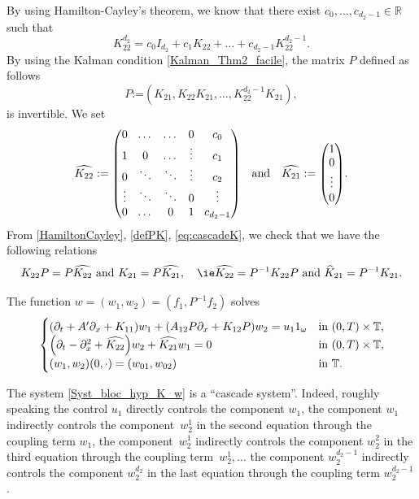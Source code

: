 \documentclass[10pt]{amsart}
\theoremstyle{plain}
\theoremstyle{definition}
\theoremstyle{remark}
\newcommand{\set}{\mathbb}
\newcommand{\R}{} %
\renewcommand{\R}{\set{R}}
\newcommand{\T}{\set{T}}
\newcommand{\coloneqq}{\mathrel{\mathord{:}\mathord=}}
\let\originalleft\left
\let\originalright\right
\renewcommand{\left}{\mathopen{}\mathclose\bgroup\originalleft}
\renewcommand{\right}{\aftergroup\egroup\originalright}
\begin{document}
By using Hamilton-Cayley's theorem, we know that there exist $c_0, \dots, c_{d_2-1} \in \R$ such that
\begin{equation}
\label{HamiltonCayley}
K_{22}^{d_2} = c_0 I_{d_2} + c_1 K_{22} + \dots + c_{d_2-1} K_{22}^{d_2-1}.
\end{equation}
By using the Kalman condition \eqref{Kalman_Thm2_facile}, the matrix $P$ defined as follows
\begin{equation}
\label{defPK}
P \coloneqq (K_{21}, K_{22} K_{21}, \dots, K_{22}^{d_2-1} K_{21}),
\end{equation}
is invertible. We set
\begin{equation}
\label{eq:cascadeK}
\arraycolsep4.5pt
\widehat{K_{22}}\coloneqq \begin{pmatrix} 0 & \dots & \dots & 0 & c_0\\
1 & 0 &\dots & \vdots & c_1\\
0 & \ddots & \ddots & \vdots & c_2\\
\vdots & \ddots & \ddots & 0 & \vdots\\
0 & \dots &0 & 1 & c_{d_2-1}
\end{pmatrix}\quad \text{and}\quad \widehat{K_{21}}\coloneqq \begin{pmatrix} 1\\0\\ \vdots\\ 0 \end{pmatrix}.
\end{equation}
From \eqref{HamiltonCayley}, \eqref{defPK}, \eqref{eq:cascadeK}, we check that we have the following relations
\[
K_{22}P = P \widehat{K_{22}}\ \text{and}\ K_{21} = P \widehat{K_{21}},\quad \text{\ie} \widehat{K_{22}}= P^{-1} K_{22} P\ \text{and}\ {\widehat K}_{21}= P^{-1} K_{21}.
\]

The function $w =(w_1,w_2) = (f_1,P^{-1}f_2)$ solves
\begin{equation} \label{Syst_bloc_hyp_K_w}
\begin{cases}
\left(\partial_t +A'\partial_x+K_{11}\right)w_1+\left(A_{12}P\partial_x+K_{12}P\right)w_2= u_1 1_\omega
&\text{in}\ (0,T)\times \T,\!\\
\left(\partial_t - \partial_x^2+\widehat{K_{22}}\right)w_2 + \widehat{K_{21}}w_1 = 0 &\text{in}\ (0,T)\times \T,\!\\
(w_1,w_2)(0,\cdot)=(w_{01},w_{02}) & \text{in}\ \T.
\end{cases}
\end{equation}

The system \eqref{Syst_bloc_hyp_K_w} is a ``cascade system''. Indeed, roughly speaking the control $u_1$ directly controls the component $w_1$, the component $w_1$ indirectly controls the component~$w_{2}^1$ in the second equation through the coupling term $w_1$, the component~$w_{2}^1$ indirectly controls the component $w_{2}^2$ in the third equation through the coupling term~$w_2^1,\ldots$ the component $w_{2}^{d_2-1}$ indirectly controls the component $w_{2}^{d_2}$ in the last equation through the coupling term $w_2^{d_2-1}$.
\end{document}
